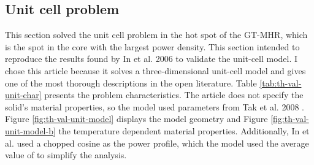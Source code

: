 \subsection{Unit cell problem}
\label{sec:unitcell}

This section solved the unit cell problem in the hot spot of the GT-MHR, which is the spot in the core with the largest power density.
This section intended to reproduce the results found by In et al. 2006 \cite{in_three-dimensional_2006} to validate the unit-cell model.
I chose this article because it solves a three-dimensional unit-cell model and gives one of the most thorough descriptions in the open literature.
Table \ref{tab:th-val-unit-char} presents the problem characteristics.
The article does not specify the solid's material properties, so the model used parameters from Tak et al. 2008 \cite{tak_numerical_2008}.
Figure \ref{fig:th-val-unit-model} displays the model geometry and Figure \ref{fig:th-val-unit-model-b} the temperature dependent material properties.
Additionally, In et al. used a chopped cosine as the power profile, which the model used the average value of to simplify the analysis.

